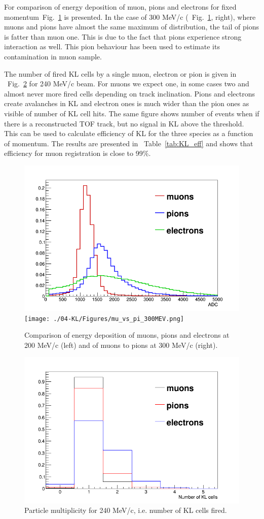 For comparison of energy deposition of muon, pions and electrons for fixed momentum~Fig.~\ref{fig:KL_mu_to_pi} is presented. In the case of 300 MeV/c (~Fig.~\ref{fig:KL_mu_to_pi}, right), where muons and pions have almost the same maximum of distribution, the tail of pions is fatter than muon one. This is due to the fact that pions experience strong interaction as well. This pion behaviour has been used to estimate its contamination in muon sample. 

The number of fired KL cells by a single muon, electron or pion is given in ~Fig.~\ref{fig:KL_mult} for 240 MeV/c beam. For muons we expect one, in some cases two and almost never more fired cells depending on track inclination. Pions and electrons create avalanches in KL and electron ones is much wider than the pion ones as visible of number of KL cell hits. The same figure shows number of events when if there is a reconstructed TOF track, but no signal in KL above the threshold. This can be used to calculate efficiency of KL for the three species as a function of momentum. The results are presented in ~Table~\ref{tab:KL_eff} and shows that efficiency for muon registration is close to 99$\%$.


 

   \begin{figure}
   	\begin{center}
   		\includegraphics[width=0.4\columnwidth]{./04-KL/Figures/mu_vs_pi_vs_e_200MEV.png}  		\texttt{[image: ./04-KL/Figures/mu\_vs\_pi\_300MEV.png]}
   		\caption{Comparison of energy deposition of muons, pions and electrons at 200 MeV/c (left) and of muons to pions at 300 MeV/c (right).}
   		\label{fig:KL_mu_to_pi}
   	\end{center}
   \end{figure}
    \begin{figure}
    	\begin{center}
    		\includegraphics[width=0.4\columnwidth]{./04-KL/Figures/multiplicity_240MEV.png}  		
    		\caption{Particle multiplicity for 240 MeV/c, i.e. number of KL cells fired.}
    		\label{fig:KL_mult}
    	\end{center}
    \end{figure}
       
